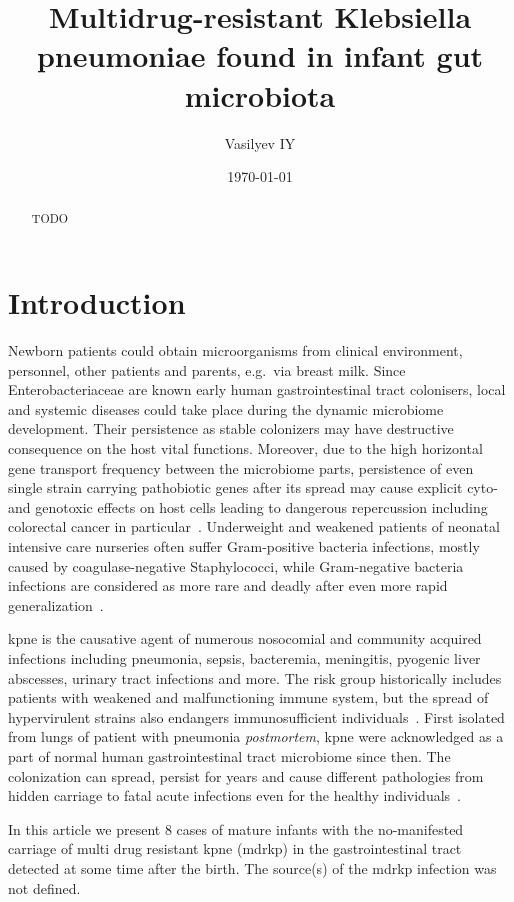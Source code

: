\documentclass[12pt,a4paper]{article}
\title{Multidrug-resistant Klebsiella pneumoniae found in infant gut microbiota}
\date{\today}
\author{Vasilyev IY}
\begin{document}
\maketitle

\begin{abstract}
TODO
\end{abstract}

\section{Introduction}\label{sec:intro}
Newborn patients could obtain microorganisms from clinical environment, personnel, other patients and parents,
e.g.\ via breast milk.
Since Enterobacteriaceae are known early human gastrointestinal tract colonisers, local and systemic diseases could take
place during the dynamic microbiome development.
Their persistence as stable colonizers may have destructive consequence on the host vital functions.
Moreover, due to the high horizontal gene transport frequency between the microbiome parts, persistence of even single
strain carrying pathobiotic genes after its spread may cause explicit cyto- and genotoxic effects on host cells
leading to dangerous repercussion including colorectal cancer in particular~\cite{Pope2019}.
Underweight and weakened patients of neonatal intensive care nurseries often suffer Gram-positive bacteria infections,
mostly caused by coagulase-negative Staphylococci, while Gram-negative bacteria infections are considered as more rare
and deadly after even more rapid generalization~\cite{Dorota2017}.

\gls{kpne} is the causative agent of numerous nosocomial and community acquired infections including
pneumonia, sepsis, bacteremia, meningitis, pyogenic liver abscesses, urinary tract infections and more.
The risk group historically includes patients with weakened and malfunctioning immune system, but the spread of
hypervirulent strains also endangers immunosufficient individuals~\cite{Shankar2018}.
First isolated from lungs of patient with pneumonia \textit{postmortem}, \gls{kpne} were acknowledged as a part of
normal human gastrointestinal tract microbiome since then.
The colonization can spread, persist for years and cause different pathologies from hidden carriage to
fatal acute infections even for the healthy individuals~\cite{Martin2018}.

In this article we present 8 cases of mature infants with the no-manifested carriage of multi drug resistant
\gls{kpne} (\gls{mdrkp}) in the gastrointestinal tract detected at some time after the birth.
The source(s) of the \gls{mdrkp} infection was not defined.
\end{document}
